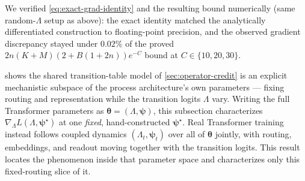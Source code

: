 We verified \cref{eq:exact-grad-identity} and the resulting bound
numerically (same random-$\Lambda$ setup as above): the exact identity matched
the analytically differentiated construction to floating-point precision,
and the observed gradient discrepancy stayed under $0.02\%$ of the proved
$2n(K+M)(2+B(1+2n))e^{-C}$ bound at $C\in\{10,20,30\}$.

 shows the shared transition-table model
of \cref{sec:operator-credit} is an explicit mechanistic subspace of the
process architecture's own parameters --- fixing routing and
representation while the transition logits $\Lambda$ vary. Writing the
full Transformer parameters as $\bm{\theta}=(\Lambda,\bm{\psi})$, this
subsection characterizes $\nabla_\Lambda L(\Lambda,\bm{\psi}^\star)$ at one
\emph{fixed}, hand-constructed $\bm{\psi}^\star$. Real Transformer training
instead follows coupled dynamics $(\Lambda_t,\bm{\psi}_t)$ over all of
$\bm{\theta}$ jointly, with routing, embeddings, and readout moving
together with the transition logits. This result locates the phenomenon
inside that parameter space and characterizes only this fixed-routing
slice of it.
